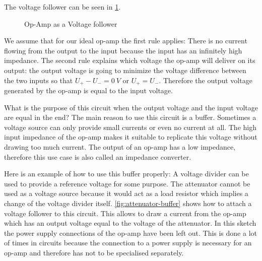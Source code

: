 The voltage follower can be seen in \cref{fig:voltage-follower}.

\begin{figure}[htb]
	\centering
	\caption{Op-Amp as a Voltage follower}
	\label{fig:voltage-follower}
\end{figure}

We assume that for our ideal op-amp the first rule applies: There is no current flowing from the output to the input because the input has an infinitely high impedance. The second rule explains which voltage the op-amp will deliver on its output: the output voltage is going to minimize the voltage difference between the two inputs so that $U_+ - U_- = \SI{0}{V}$ or $U_+ = U_-$. Therefore the output voltage generated by the op-amp is equal to the input voltage.

What is the purpose of this circuit when the output voltage and the input voltage are equal in the end? The main reason to use this circuit is a buffer. Sometimes a voltage source can only provide small currents or even no current at all. The high input impedance of the op-amp makes it suitable to replicate this voltage without drawing too much current. The output of an op-amp has a low impedance, therefore this use case is also called an \glqq{}impedance converter\grqq{}.

Here is an example of how to use this buffer properly: A voltage divider can be used to provide a reference voltage for some purpose. The attenuator cannot be used as a voltage source because it would act as a load resistor which implies a change of the voltage divider itself. \cref{fig:attenuator-buffer} shows how to attach a voltage follower to this circuit. This allows to draw a current from the op-amp which has an output voltage equal to the voltage of the attenuator. In this sketch the power supply connections of the op-amp have been left out. This is done a lot of times in circuits because the connection to a power supply is necessary for an op-amp and therefore has not to be specialised separately.

